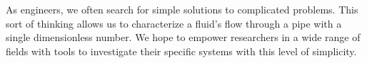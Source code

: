 \documentclass[11pt]{article}
\begin{document}
\indent As engineers, we often search for simple solutions to complicated problems. This sort of thinking allows us to characterize a fluid's flow through a pipe with a single dimensionless number. We hope to empower researchers in a wide range of fields with tools to investigate their specific systems with this level of simplicity.\\
\end{document}
